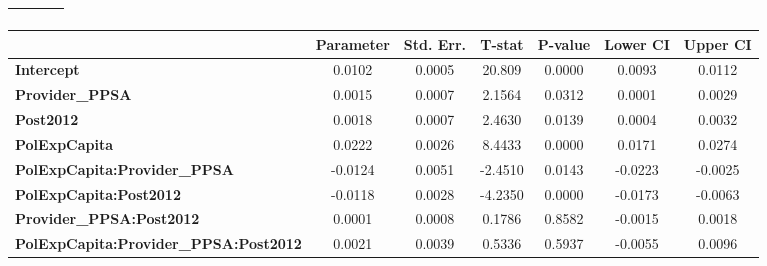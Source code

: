 \begin{center}
\begin{tabular}{lclc}
\textbf{}                                     &                    & \textbf{                     }   &                  \\
\bottomrule
\end{tabular}
\begin{tabular}{lcccccc}
                                              & \textbf{Parameter} & \textbf{Std. Err.} & \textbf{T-stat} & \textbf{P-value} & \textbf{Lower CI} & \textbf{Upper CI}  \\
\midrule
\textbf{Intercept}                            &       0.0102       &       0.0005       &      20.809     &      0.0000      &       0.0093      &       0.0112       \\
\textbf{Provider\_PPSA}                       &       0.0015       &       0.0007       &      2.1564     &      0.0312      &       0.0001      &       0.0029       \\
\textbf{Post2012}                             &       0.0018       &       0.0007       &      2.4630     &      0.0139      &       0.0004      &       0.0032       \\
\textbf{PolExpCapita}                         &       0.0222       &       0.0026       &      8.4433     &      0.0000      &       0.0171      &       0.0274       \\
\textbf{PolExpCapita:Provider\_PPSA}          &      -0.0124       &       0.0051       &     -2.4510     &      0.0143      &      -0.0223      &      -0.0025       \\
\textbf{PolExpCapita:Post2012}                &      -0.0118       &       0.0028       &     -4.2350     &      0.0000      &      -0.0173      &      -0.0063       \\
\textbf{Provider\_PPSA:Post2012}              &       0.0001       &       0.0008       &      0.1786     &      0.8582      &      -0.0015      &       0.0018       \\
\textbf{PolExpCapita:Provider\_PPSA:Post2012} &       0.0021       &       0.0039       &      0.5336     &      0.5937      &      -0.0055      &       0.0096       \\
\bottomrule
\end{tabular}
\end{center}